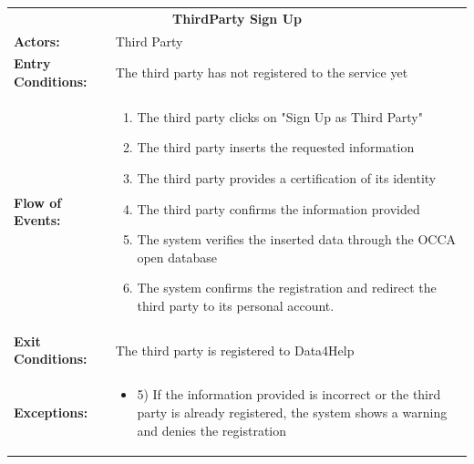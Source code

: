 \begin{table}[H]
	\centering
	{\renewcommand{\arraystretch}{1.5}%
		\begin{tabular}{|@{\hspace{2em}} p{4cm} @{}| p{11cm} @{\qquad}|}
			\cline{1-2}
			\multicolumn{2}{|c|}{\textbf{ThirdParty Sign Up}} \\ \cline{1-2}
			\textbf{Actors:} & Third Party \\ \cline{1-2}
			\textbf{Entry Conditions:} & The third party has not registered to the service yet \\ \cline{1-2}
			\textbf{Flow of Events:} & 
			\begin{enumerate}[itemsep=-0.2em, topsep=0em]
				\item The third party clicks on "Sign Up as Third Party"
				\item The third party inserts the requested information
				\item The third party provides a certification of its identity
				\item The third party confirms the information provided
				\item The system verifies the inserted data through the OCCA open database
				\item The system confirms the registration and redirect the third party to its personal account.
			\end{enumerate}\\ \cline{1-2}
			\textbf{Exit Conditions:} & The third party is registered to Data4Help \\ \hline
			\textbf{Exceptions:} & 
			\begin{itemize}[itemsep=-0.2em, topsep=0em]
				\item 5) If the information provided is incorrect or the third party is already registered, the system shows a warning and denies the registration
			\end{itemize} \\ \hline
	\end{tabular}} \quad
\end{table}

